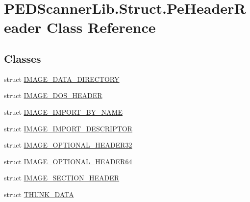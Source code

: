 \hypertarget{class_p_e_d_scanner_lib_1_1_struct_1_1_pe_header_reader}{}\section{P\+E\+D\+Scanner\+Lib.\+Struct.\+Pe\+Header\+Reader Class Reference}
\label{class_p_e_d_scanner_lib_1_1_struct_1_1_pe_header_reader}
\subsection*{Classes}
\begin{DoxyCompactItemize}
\item 
struct \mbox{\hyperlink{struct_p_e_d_scanner_lib_1_1_struct_1_1_pe_header_reader_1_1_i_m_a_g_e___d_a_t_a___d_i_r_e_c_t_o_r_y}{I\+M\+A\+G\+E\+\_\+\+D\+A\+T\+A\+\_\+\+D\+I\+R\+E\+C\+T\+O\+RY}}
\item 
struct \mbox{\hyperlink{struct_p_e_d_scanner_lib_1_1_struct_1_1_pe_header_reader_1_1_i_m_a_g_e___d_o_s___h_e_a_d_e_r}{I\+M\+A\+G\+E\+\_\+\+D\+O\+S\+\_\+\+H\+E\+A\+D\+ER}}
\item 
struct \mbox{\hyperlink{struct_p_e_d_scanner_lib_1_1_struct_1_1_pe_header_reader_1_1_i_m_a_g_e___i_m_p_o_r_t___b_y___n_a_m_e}{I\+M\+A\+G\+E\+\_\+\+I\+M\+P\+O\+R\+T\+\_\+\+B\+Y\+\_\+\+N\+A\+ME}}
\item 
struct \mbox{\hyperlink{struct_p_e_d_scanner_lib_1_1_struct_1_1_pe_header_reader_1_1_i_m_a_g_e___i_m_p_o_r_t___d_e_s_c_r_i_p_t_o_r}{I\+M\+A\+G\+E\+\_\+\+I\+M\+P\+O\+R\+T\+\_\+\+D\+E\+S\+C\+R\+I\+P\+T\+OR}}
\item 
struct \mbox{\hyperlink{struct_p_e_d_scanner_lib_1_1_struct_1_1_pe_header_reader_1_1_i_m_a_g_e___o_p_t_i_o_n_a_l___h_e_a_d_e_r32}{I\+M\+A\+G\+E\+\_\+\+O\+P\+T\+I\+O\+N\+A\+L\+\_\+\+H\+E\+A\+D\+E\+R32}}
\item 
struct \mbox{\hyperlink{struct_p_e_d_scanner_lib_1_1_struct_1_1_pe_header_reader_1_1_i_m_a_g_e___o_p_t_i_o_n_a_l___h_e_a_d_e_r64}{I\+M\+A\+G\+E\+\_\+\+O\+P\+T\+I\+O\+N\+A\+L\+\_\+\+H\+E\+A\+D\+E\+R64}}
\item 
struct \mbox{\hyperlink{struct_p_e_d_scanner_lib_1_1_struct_1_1_pe_header_reader_1_1_i_m_a_g_e___s_e_c_t_i_o_n___h_e_a_d_e_r}{I\+M\+A\+G\+E\+\_\+\+S\+E\+C\+T\+I\+O\+N\+\_\+\+H\+E\+A\+D\+ER}}
\item 
struct \mbox{\hyperlink{struct_p_e_d_scanner_lib_1_1_struct_1_1_pe_header_reader_1_1_t_h_u_n_k___d_a_t_a}{T\+H\+U\+N\+K\+\_\+\+D\+A\+TA}}
\end{DoxyCompactItemize}
